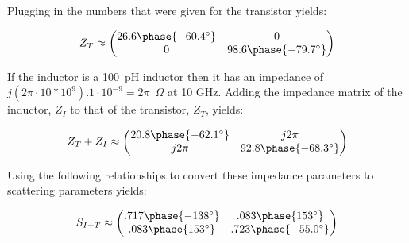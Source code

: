 Plugging in the numbers that were given for the transistor yields:

\[ 
        Z_T \approx \begin{pmatrix}
            26.6 \phase{-60.4\degree} & 0 \\ 0 & 98.6 \phase{-79.7 \degree}
        \end{pmatrix} 
\]

If the inductor is a \SI{100}{\pico\henry} inductor then it has an impedance of
$j (2\pi \cdot 10*10^{9}).1 \cdot 10^{-9} = 2\pi$~$\Omega$ at 10 GHz. Adding the
impedance matrix of the inductor, $Z_I$ to that of the transistor, $Z_T$,
yields:

\[ 
    Z_T + Z_I \approx \begin{pmatrix}
        20.8\phase{-62.1 \degree} & j2\pi \\
        j2\pi & 92.8 \phase{-68.3 \degree}
    \end{pmatrix} 
\]

Using the following relationships to convert these impedance parameters to
scattering parameters yields:

\[ 
        S_{I+T} \approx \begin{pmatrix}
            .717 \phase{-138\degree} & .083 \phase{153\degree} \\
            .083 \phase{153\degree} & .723 \phase{-55.0 \degree}
    \end{pmatrix} 
\]


